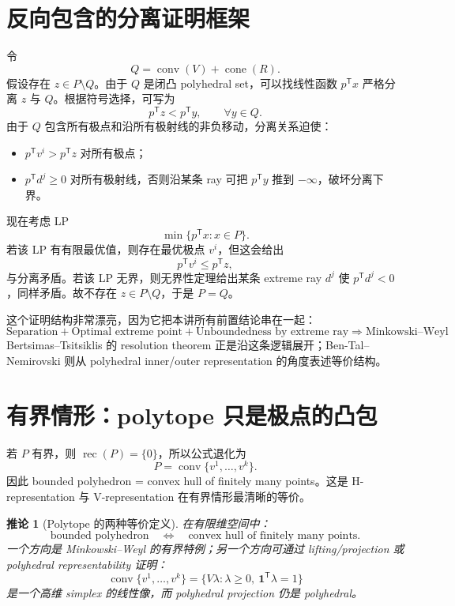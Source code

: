 \documentclass[11pt,a4paper,openany]{ctexrep}
\newtheorem{corollary}[theorem]{推论}
\theoremstyle{definition}
\newcommand{\conv}{\operatorname{conv}}
\newcommand{\cone}{\operatorname{cone}}
\newcommand{\rec}{\operatorname{rec}}
\newcommand{\transpose}{\mathsf{T}}
\begin{document}
\section{反向包含的分离证明框架}
令
\[
Q=\conv(V)+\cone(R).
\]
假设存在 $z\in P\setminus Q$。由于 $Q$ 是闭凸 polyhedral set，可以找线性函数 $p^\transpose x$ 严格分离 $z$ 与 $Q$。根据符号选择，可写为
\[
p^\transpose z< p^\transpose y,
\qquad \forall y\in Q.
\]
由于 $Q$ 包含所有极点和沿所有极射线的非负移动，分离关系迫使：
\begin{itemize}[leftmargin=2em]
  \item $p^\transpose v^i>p^\transpose z$ 对所有极点；
  \item $p^\transpose d^j\ge0$ 对所有极射线，否则沿某条 ray 可把 $p^\transpose y$ 推到 $-\infty$，破坏分离下界。
\end{itemize}
现在考虑 LP
\[
\min\{p^\transpose x:x\in P\}.
\]
若该 LP 有有限最优值，则存在最优极点 $v^i$，但这会给出
\[
p^\transpose v^i\le p^\transpose z,
\]
与分离矛盾。若该 LP 无界，则无界性定理给出某条 extreme ray $d^j$ 使 $p^\transpose d^j<0$，同样矛盾。故不存在 $z\in P\setminus Q$，于是 $P=Q$。

这个证明结构非常漂亮，因为它把本讲所有前置结论串在一起：
\[
\boxed{
\text{Separation}
+\text{Optimal extreme point}
+\text{Unboundedness by extreme ray}
\Rightarrow
\text{Minkowski--Weyl}
}
\]
Bertsimas--Tsitsiklis 的 resolution theorem 正是沿这条逻辑展开；Ben-Tal--Nemirovski 则从 polyhedral inner/outer representation 的角度表述等价结构。\cite[\S4.9]{bertsimas}\cite[Appendix~B.2.9]{bental}

\section{有界情形：polytope 只是极点的凸包}
若 $P$ 有界，则 $\rec(P)=\{0\}$，所以公式退化为
\[
P=\conv\{v^1,\dots,v^k\}.
\]
因此 bounded polyhedron = convex hull of finitely many points。这是 H-representation 与 V-representation 在有界情形最清晰的等价。


\begin{corollary}[Polytope 的两种等价定义]
在有限维空间中：
\[
\boxed{\text{bounded polyhedron}}
\quad\Longleftrightarrow\quad
\boxed{\text{convex hull of finitely many points}}.
\]
一个方向是 Minkowski--Weyl 的有界特例；另一个方向可通过 lifting/projection 或 polyhedral representability 证明：
\[
\conv\{v^1,\ldots,v^k\}
=\{V\lambda:\lambda\ge0,\ \mathbf1^\transpose\lambda=1\}
\]
是一个高维 simplex 的线性像，而 polyhedral projection 仍是 polyhedral。
\end{corollary}
\end{document}
